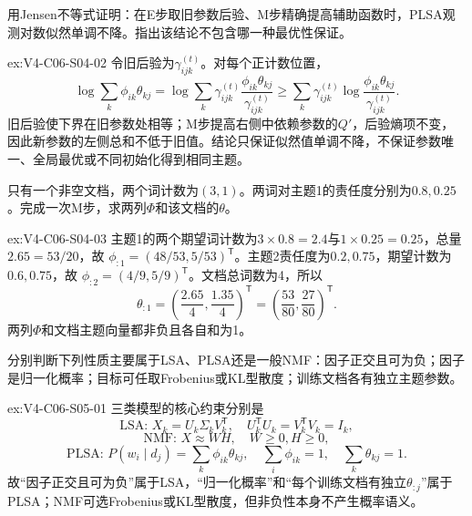 \begin{SLChapterExercisePairSection}
\begin{exercise}\label{ex:V4-C06-S04-02}
用Jensen不等式证明：在E步取旧参数后验、M步精确提高辅助函数时，PLSA观测对数似然单调不降。指出该结论不包含哪一种最优性保证。
\end{exercise}
\ifSLFullEdition
{}\label{sol:V4-C06-S04-02}
\begin{chapterexercisesolution}{ex:V4-C06-S04-02}
令旧后验为$\gamma_{ijk}^{(t)}$。对每个正计数位置，
\[
\log\sum_k\phi_{ik}\theta_{kj}
=\log\sum_k\gamma_{ijk}^{(t)}
\frac{\phi_{ik}\theta_{kj}}{\gamma_{ijk}^{(t)}}
\ge\sum_k\gamma_{ijk}^{(t)}
\log\frac{\phi_{ik}\theta_{kj}}{\gamma_{ijk}^{(t)}}.
\]
旧后验使下界在旧参数处相等；M步提高右侧中依赖参数的$Q'$，后验熵项不变，因此新参数的左侧总和不低于旧值。结论只保证似然值单调不降，不保证参数唯一、全局最优或不同初始化得到相同主题。
\end{chapterexercisesolution}
\fi

\begin{exercise}\label{ex:V4-C06-S04-03}
只有一个非空文档，两个词计数为$(3,1)$。两词对主题1的责任度分别为$0.8,0.25$。完成一次M步，求两列$\Phi$和该文档的$\theta$。
\end{exercise}
\ifSLFullEdition
{}\label{sol:V4-C06-S04-03}
\begin{chapterexercisesolution}{ex:V4-C06-S04-03}
主题1的两个期望词计数为$3\times0.8=2.4$与$1\times0.25=0.25$，总量$2.65=53/20$，故
$\phi_{:1}=(48/53,5/53)^{\mathsf T}$。主题2责任度为$0.2,0.75$，期望计数为$0.6,0.75$，故
$\phi_{:2}=(4/9,5/9)^{\mathsf T}$。文档总词数为4，所以
\[
\theta_{:1}=\left(\frac{2.65}{4},\frac{1.35}{4}\right)^{\mathsf T}
=\left(\frac{53}{80},\frac{27}{80}\right)^{\mathsf T}.
\]
两列$\Phi$和文档主题向量都非负且各自和为1。
\end{chapterexercisesolution}
\fi

\begin{exercise}\label{ex:V4-C06-S05-01}
分别判断下列性质主要属于LSA、PLSA还是一般NMF：因子正交且可为负；因子是归一化概率；目标可任取Frobenius或KL型散度；训练文档各有独立主题参数。
\end{exercise}
\ifSLFullEdition
{}\label{sol:V4-C06-S05-01}
\begin{chapterexercisesolution}{ex:V4-C06-S05-01}
三类模型的核心约束分别是
\[
\text{LSA: }X_k=U_k\Sigma_kV_k^{\mathsf T},
\quad U_k^{\mathsf T}U_k=V_k^{\mathsf T}V_k=I_k,
\]
\[
\text{NMF: }X\approx WH,
\quad W\ge0, H\ge0,
\]
\[
\text{PLSA: }P(w_i\mid d_j)=\sum_k\phi_{ik}\theta_{kj},
\quad \sum_i\phi_{ik}=1,
\quad \sum_k\theta_{kj}=1.
\]
故“因子正交且可为负”属于LSA，“归一化概率”和“每个训练文档有独立$\theta_{:j}$”属于PLSA；NMF可选Frobenius或KL型散度，但非负性本身不产生概率语义。
\end{chapterexercisesolution}
\fi


\end{SLChapterExercisePairSection}
